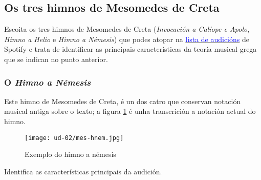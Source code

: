 \subsection*{Os tres himnos de Mesomedes de Creta}
%
Escoita os tres himnos de Mesomedes de Creta (\textit{Invocación a Calíope e Apolo}, \textit{Himno a Helio} e \textit{Himno a Némesis}) que podes atopar na {\href{https://open.spotify.com/playlist/19fWZwUGX6rDo0bejNcWGE?si=1c00d5ff65b24678}{\textcolor{blue}{lista de audicións}}} de Spotify e trata de identificar as principais características da teoría musical grega que se indican no punto anterior.
\par
%
\subsubsection*{O \textit{Himno a Némesis}}
%
Este himno de Mesomedes de Creta, é un dos catro que conservan notación musical antiga sobre o texto; a figura \ref{nemesis-himno} é unha transcrición a notación actual do himno.
%
\begin{figure}[htp]
    \centering
	\texttt{[image: ud-02/mes-hnem.jpg]}
	\caption{Exemplo do himno a némesis}
	\label{nemesis-himno}
	\end{figure}
%
\begin{ejercicio}
Identifica as características principais da audición.
        \vspace*{3.3cm}
\end{ejercicio}
 
